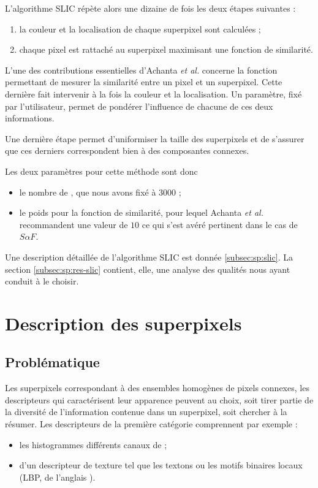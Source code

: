 L'algorithme SLIC répète alors une dizaine de fois les  deux étapes suivantes :
\begin{enumerate}
\item la couleur et la localisation  de chaque superpixel sont calculées ;
\item chaque pixel est rattaché au superpixel maximisant une fonction de similarité.
\end{enumerate}

L'une des contributions essentielles d'Achanta \textit{et al.} concerne la fonction permettant de mesurer la similarité entre un pixel et un superpixel. Cette dernière fait intervenir à la fois la couleur et la localisation. Un paramètre, fixé par l'utilisateur, permet de pondérer l'influence de chacune de ces deux informations.  

Une dernière étape permet d'uniformiser la taille des superpixels et de s'assurer que ces derniers correspondent bien à des composantes connexes.

Les deux paramètres  pour cette méthode sont donc \modif{:}
\begin{itemize}
\item le nombre de , que nous avons fixé à $3000$ ;
\item le poids pour la fonction de similarité, pour lequel Achanta \textit{et al.} \cite{achanta2012slic} recommandent une valeur de $10$\modif{,} ce qui s'est avéré pertinent dans le cas de $S \alpha F$.
\end{itemize}

Une description détaillée de l'algorithme SLIC est donnée  \ref{subsec:sp:slic}. La section \ref{subsec:sp:res-slic} contient,  elle, une analyse des qualités nous ayant conduit à le choisir. 

\section{Description des superpixels }

\subsection{Problématique}

Les superpixels correspondant à des ensembles homogènes de pixels connexes, les descripteurs qui caractérisent leur apparence peuvent au choix, soit tirer partie de la diversité de l'information contenue dans un superpixel, soit chercher à la résumer. Les descripteurs de la première catégorie comprennent par exemple :
\begin{itemize}
\item les histogrammes  différents canaux de  ;
\item {} d'un descripteur de texture tel que les textons ou les motifs binaires locaux \cite{pietikainen2011local} (LBP, de l'anglais ).
\end{itemize}

